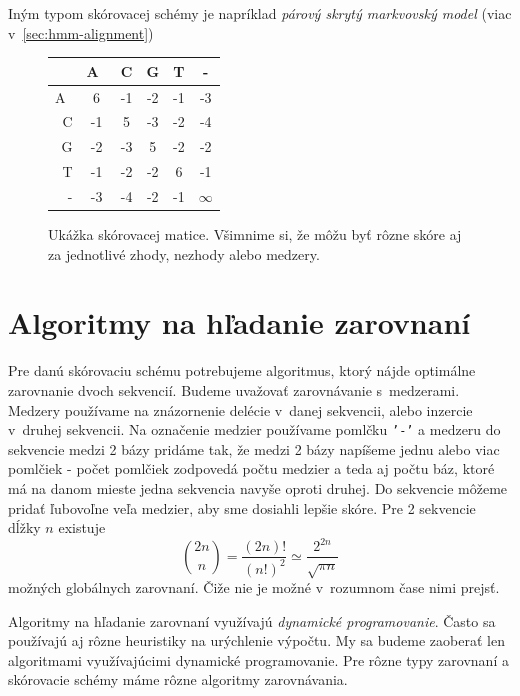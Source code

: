 Iným typom skórovacej schémy je napríklad \textit{párový skrytý markvovský model} (viac v~\ref{sec:hmm-alignment})

\begin{figure}[hbtp]
    \centering
    \begin{tabular}{r|ccccc}
    & A~& C & G & T & -\\
    \hline
    A~& 6 & -1 & -2 & -1 & -3\\
    C & -1 & 5 & -3 & -2 & -4\\
    G & -2 & -3 & 5 & -2 & -2\\
    T & -1 & -2 & -2 & 6 & -1\\
    - & -3 & -4 & -2 & -1 & $\infty$\\
    \end{tabular}
    \caption[Skórovacia matica]{Ukážka skórovacej matice. Všimnime si, že môžu byť rôzne skóre aj za jednotlivé zhody, nezhody alebo medzery.}
    \label{fig:scoringmatrix}
\end{figure}

\section[Algoritmy]{Algoritmy na hľadanie zarovnaní}
Pre danú skórovaciu schému potrebujeme algoritmus, ktorý nájde optimálne zarovnanie dvoch sekvencií.
Budeme uvažovať zarovnávanie s~medzerami. Medzery používame na znázornenie delécie v~danej sekvencii, alebo inzercie v~druhej sekvencii. Na označenie medzier používame pomlčku {\tt'-'} a medzeru do sekvencie medzi 2 bázy pridáme tak, že medzi 2 bázy napíšeme jednu alebo viac pomlčiek - počet pomlčiek zodpovedá počtu medzier a teda aj počtu báz, ktoré má na danom mieste jedna sekvencia navyše oproti druhej. Do sekvencie môžeme pridať ľubovoľne veľa medzier, aby sme dosiahli lepšie skóre. Pre 2 sekvencie dĺžky $n$ existuje
$$ {2n \choose n}  = \frac{(2n)!}{(n!)^2} \simeq \frac{2^{2n}}{\sqrt{\pi n}} $$
možných globálnych zarovnaní. \cite{durbin} Čiže nie je možné v~rozumnom čase nimi prejsť.

Algoritmy na hľadanie zarovnaní využívajú \textit{dynamické programovanie}.
Často sa používajú aj rôzne heuristiky na urýchlenie výpočtu.
My sa budeme zaoberať len algoritmami využívajúcimi dynamické programovanie. Pre rôzne typy zarovnaní a skórovacie schémy máme rôzne algoritmy zarovnávania.
\cite{durbin, skripta}

